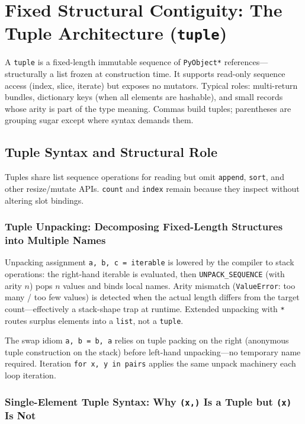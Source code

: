 \documentclass[a4paper,twoside]{report}
\begin{document}
\section{Fixed Structural Contiguity: The Tuple Architecture (\texttt{tuple})}

A \texttt{tuple} is a fixed-length immutable sequence of \texttt{PyObject*} references---structurally a list frozen at construction time. It supports read-only sequence access (index, slice, iterate) but exposes no mutators. Typical roles: multi-return bundles, dictionary keys (when all elements are hashable), and small records whose arity is part of the type meaning. Commas build tuples; parentheses are grouping sugar except where syntax demands them.


\subsection{Tuple Syntax and Structural Role}

Tuples share list sequence operations for reading but omit \texttt{append}, \texttt{sort}, and other resize/mutate APIs. \texttt{count} and \texttt{index} remain because they inspect without altering slot bindings.

\subsubsection{Tuple Unpacking: Decomposing Fixed-Length Structures into Multiple Names}

Unpacking assignment \texttt{a, b, c = iterable} is lowered by the compiler to stack operations: the right-hand iterable is evaluated, then \texttt{UNPACK\_SEQUENCE} (with arity $n$) pops $n$ values and binds local names. Arity mismatch (\texttt{ValueError}: too many / too few values) is detected when the actual length differs from the target count---effectively a stack-shape trap at runtime. Extended unpacking with \texttt{*} routes surplus elements into a \texttt{list}, not a \texttt{tuple}.

The swap idiom \texttt{a, b = b, a} relies on tuple packing on the right (anonymous tuple construction on the stack) before left-hand unpacking---no temporary name required. Iteration \texttt{for x, y in pairs} applies the same unpack machinery each loop iteration.

\subsubsection{Single-Element Tuple Syntax: Why \texttt{(x,)} Is a Tuple but \texttt{(x)} Is Not}
\end{document}
